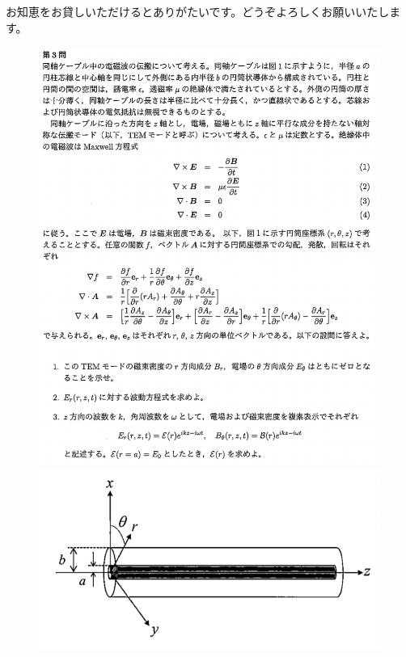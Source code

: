 \documentclass[10pt]{ltjsarticle}
\begin{document}
    お知恵をお貸しいただけるとありがたいです。どうぞよろしくお願いいたします。

    \begin{figure}[hbt]
        \centering
        \includegraphics[width=0.7\linewidth,keepaspectratio]{./img/tokyoR2EM.png}
        \includegraphics[width=0.7\linewidth,keepaspectratio]{./img/coaxial.png}
        \label{fig:}
    \end{figure}
    
    
    
\end{document}
